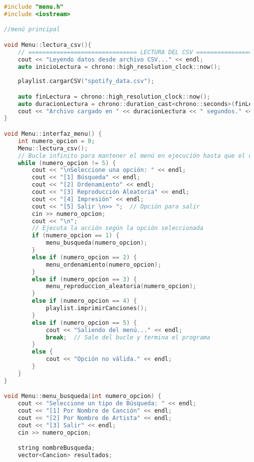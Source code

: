 \documentclass[12pt]{article}
\begin{document}
\begin{flushleft}
            \begin{lstlisting}[language=C++, style=mystyle, caption={Cabecera de la Clase Menú}]
#include "menu.h"
#include <iostream>

//menú principal

void Menu::lectura_csv(){
    // =============================== LECTURA DEL CSV ===============================
    cout << "Leyendo datos desde archivo CSV..." << endl;
    auto inicioLectura = chrono::high_resolution_clock::now();
    
    playlist.cargarCSV("spotify_data.csv");

    auto finLectura = chrono::high_resolution_clock::now();
    auto duracionLectura = chrono::duration_cast<chrono::seconds>(finLectura - inicioLectura).count();
    cout << "Archivo cargado en " << duracionLectura << " segundos." << endl; 
}

void Menu::interfaz_menu() {
    int numero_opcion = 0;
    Menu::lectura_csv();
    // Bucle infinito para mantener el menú en ejecución hasta que el usuario elija salir
    while (numero_opcion != 5) {
        cout << "\nSeleccione una opción: " << endl;
        cout << "[1] Búsqueda" << endl;
        cout << "[2] Ordenamiento" << endl;
        cout << "[3] Reproducción Aleatoria" << endl;
        cout << "[4] Impresión" << endl;
        cout << "[5] Salir \n>> ";  // Opción para salir
        cin >> numero_opcion;
        cout << "\n";
        // Ejecuta la acción según la opción seleccionada
        if (numero_opcion == 1) {
            menu_busqueda(numero_opcion);
        }
        else if (numero_opcion == 2) {
            menu_ordenamiento(numero_opcion);
        }
        else if (numero_opcion == 3) {
            menu_reproduccion_aleatoria(numero_opcion);
        }
        else if (numero_opcion == 4) {
            playlist.imprimirCanciones();
        }
        else if (numero_opcion == 5) {
            cout << "Saliendo del menú..." << endl;
            break;  // Sale del bucle y termina el programa
        }
        else {
            cout << "Opción no válida." << endl;
        }
    }
}

void Menu::menu_busqueda(int numero_opcion) {
    cout << "Seleccione un tipo de Búsqueda: " << endl;
    cout << "[1] Por Nombre de Canción" << endl;
    cout << "[2] Por Nombre de Artista" << endl;
    cout << "[3] Salir" << endl;
    cin >> numero_opcion;

    string nombreBusqueda;
    vector<Cancion> resultados;


\end{lstlisting}
\end{flushleft}
\end{document}
